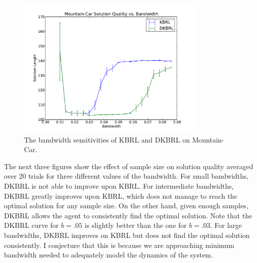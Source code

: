 \begin{figure}[!!!ht]
  \centering
  \includegraphics[width=90mm]{figs/chap5/mcband2.pdf}
  \caption[Bandwidth sensitivities of KBRL and DKBRL on Mountain-Car]
{The bandwidth sensitivities of KBRL and DKBRL on Mountain-Car.}
\end{figure}

The next three figures show the effect of sample size on solution quality
averaged over 20 trials for three different values of the bandwidth.
For small bandwidths, DKBRL is not able to improve upon KBRL.
For intermediate bandwidths, DKBRL greatly improves upon KBRL, which does not
manage to reach the optimal solution for any sample size.
On the other hand, given enough samples, DKBRL allows the agent to
consistently find the optimal solution.
Note that the DKBRL curve for $b=.05$ is slightly better than the
one for $b=.03$.
For large bandwidths, DKBRL improves on KBRL but does not find the optimal
solution consistently.
I conjecture that this is because we are approaching minimum
bandwidth needed to adequately model the dynamics of the system.

